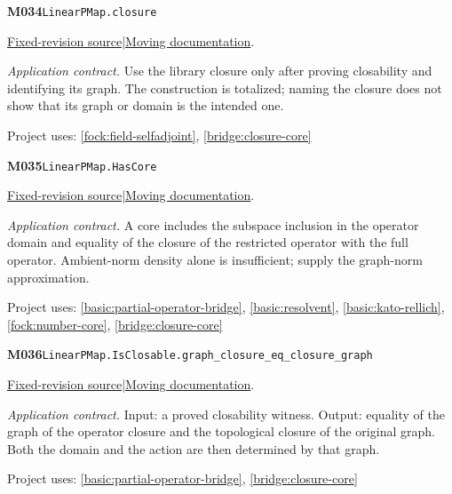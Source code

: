 \documentclass[11pt,a4paper]{article}
\theoremstyle{definition}
\theoremstyle{remark}
\begin{document}
\noindent\textbf{M034}\label{base:M034}\quad\nolinkurl{LinearPMap.closure}

\href{https://github.com/leanprover-community/mathlib4/blob/9bac2d0692944a775113f7c130fd5e5b4608a854/Mathlib/Topology/Algebra/Module/LinearPMap.lean}{Fixed-revision source}\quad|\quad\href{https://leanprover-community.github.io/mathlib4_docs/Mathlib/Topology/Algebra/Module/LinearPMap.html#LinearPMap.closure}{Moving documentation}.\par
\noindent\textit{Application contract.} Use the library closure only after proving closability and identifying its graph. The construction is totalized; naming the closure does not show that its graph or domain is the intended one.\par
{\small Project uses: \ref{fock:field-selfadjoint}, \ref{bridge:closure-core}}\par\medskip

\noindent\textbf{M035}\label{base:M035}\quad\nolinkurl{LinearPMap.HasCore}

\href{https://github.com/leanprover-community/mathlib4/blob/9bac2d0692944a775113f7c130fd5e5b4608a854/Mathlib/Topology/Algebra/Module/LinearPMap.lean}{Fixed-revision source}\quad|\quad\href{https://leanprover-community.github.io/mathlib4_docs/Mathlib/Topology/Algebra/Module/LinearPMap.html#LinearPMap.HasCore}{Moving documentation}.\par
\noindent\textit{Application contract.} A core includes the subspace inclusion in the operator domain and equality of the closure of the restricted operator with the full operator. Ambient-norm density alone is insufficient; supply the graph-norm approximation.\par
{\small Project uses: \ref{basic:partial-operator-bridge}, \ref{basic:resolvent}, \ref{basic:kato-rellich}, \ref{fock:number-core}, \ref{bridge:closure-core}}\par\medskip

\noindent\textbf{M036}\label{base:M036}\quad\nolinkurl{LinearPMap.IsClosable.graph_closure_eq_closure_graph}

\href{https://github.com/leanprover-community/mathlib4/blob/9bac2d0692944a775113f7c130fd5e5b4608a854/Mathlib/Topology/Algebra/Module/LinearPMap.lean}{Fixed-revision source}\quad|\quad\href{https://leanprover-community.github.io/mathlib4_docs/Mathlib/Topology/Algebra/Module/LinearPMap.html#LinearPMap.IsClosable.graph_closure_eq_closure_graph}{Moving documentation}.\par
\noindent\textit{Application contract.} Input: a proved closability witness. Output: equality of the graph of the operator closure and the topological closure of the original graph. Both the domain and the action are then determined by that graph.\par
{\small Project uses: \ref{basic:partial-operator-bridge}, \ref{bridge:closure-core}}\par\medskip
\end{document}
